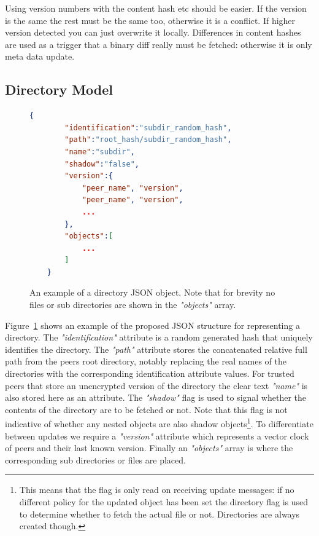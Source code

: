 Using version numbers with the content hash etc should be easier.
If the version is the same the rest must be the same too, otherwise it is a conflict.
If higher version detected you can just overwrite it locally.
Differences in content hashes are used as a trigger that a binary diff really must be fetched: otherwise it is only meta data update.

\subsection{Directory Model}
\label{sec:dir_model}

\begin{figure}[htp]
    \begin{lstlisting}[language=json,firstnumber=0]
    {
        "identification":"subdir_random_hash",
        "path":"root_hash/subdir_random_hash",
        "name":"subdir",
        "shadow":"false",
        "version":{
            "peer_name", "version",
            "peer_name", "version",
            ...
        },
        "objects":[
            ...
        ]
    }
    \end{lstlisting}
\caption[Directory JSON Model]{An example of a directory JSON object. Note that for brevity no files or sub directories are shown in the \textit{"objects"} array.}
\label{json:directory_model}
\end{figure}

Figure~\ref{json:directory_model} shows an example of the proposed JSON structure for representing a directory.
The \textit{"identification"} attribute is a random generated hash that uniquely identifies the directory.
The \textit{"path"} attribute stores the concatenated relative full path from the peers root directory, notably replacing the real names of the directories with the corresponding identification attribute values.
For trusted peers that store an unencrypted version of the directory the clear text \textit{"name"} is also stored here as an attribute.
The \textit{"shadow"} flag is used to signal whether the contents of the directory are to be fetched or not.
Note that this flag is not indicative of whether any nested objects are also shadow objects\footnote{This means that the flag is only read on receiving update messages: if no different policy for the updated object has been set the directory flag is used to determine whether to fetch the actual file or not. Directories are always created though.}.
To differentiate between updates we require a \textit{"version"} attribute which represents a vector clock of peers and their last known version.
Finally an \textit{"objects"} array is where the corresponding sub directories or files are placed.

